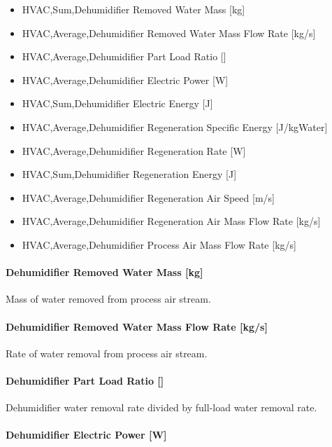\begin{itemize}
\item
  HVAC,Sum,Dehumidifier Removed Water Mass {[}kg{]}
\item
  HVAC,Average,Dehumidifier Removed Water Mass Flow Rate {[}kg/s{]}
\item
  HVAC,Average,Dehumidifier Part Load Ratio {[]}
\item
  HVAC,Average,Dehumidifier Electric Power {[}W{]}
\item
  HVAC,Sum,Dehumidifier Electric Energy {[}J{]}
\item
  HVAC,Average,Dehumidifier Regeneration Specific Energy {[}J/kgWater{]}
\item
  HVAC,Average,Dehumidifier Regeneration Rate {[}W{]}
\item
  HVAC,Sum,Dehumidifier Regeneration Energy {[}J{]}
\item
  HVAC,Average,Dehumidifier Regeneration Air Speed {[}m/s{]}
\item
  HVAC,Average,Dehumidifier Regeneration Air Mass Flow Rate {[}kg/s{]}
\item
  HVAC,Average,Dehumidifier Process Air Mass Flow Rate {[}kg/s{]}
\end{itemize}

\paragraph{Dehumidifier Removed Water Mass {[}kg{]}}\label{dehumidifier-removed-water-mass-kg}

Mass of water removed from process air stream.

\paragraph{Dehumidifier Removed Water Mass Flow Rate {[}kg/s{]}}\label{dehumidifier-removed-water-mass-flow-rate-kgs}

Rate of water removal from process air stream.

\paragraph{Dehumidifier Part Load Ratio {[]}}\label{dehumidifier-part-load-ratio}

Dehumidifier water removal rate divided by full-load water removal rate.

\paragraph{Dehumidifier Electric Power {[}W{]}}\label{dehumidifier-electric-power-w}


